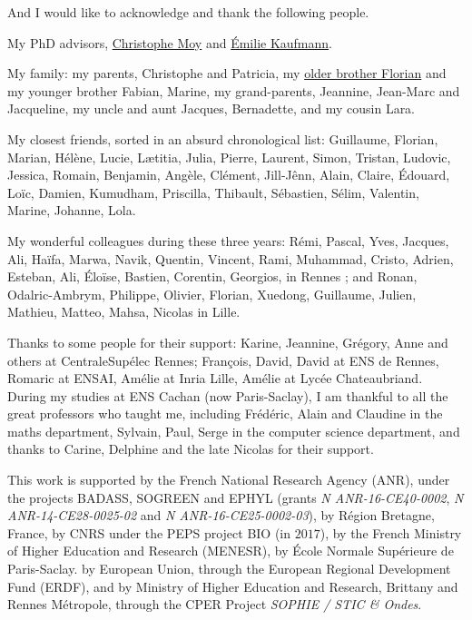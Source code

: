 
\begin{acknowledgements}


And I would like to acknowledge and thank the following people.

My PhD advisors, \href{https://moychristophe.wordpress.com/}{Christophe Moy} and \href{http://chercheurs.lille.inria.fr/ekaufman/research.html}{Émilie Kaufmann}.

My family: my parents, Christophe and Patricia, my \href{https://paris-sorbonne.academia.edu/FBesson}{older brother Florian} and my younger brother Fabian, Marine, my grand-parents, Jeannine, Jean-Marc and Jacqueline, my uncle and aunt Jacques, Bernadette, and my cousin Lara.

My closest friends, sorted in an absurd chronological list: Guillaume, Florian, Marian, Hélène, Lucie, Lætitia, Julia, Pierre, Laurent, Simon, Tristan, Ludovic, Jessica, Romain, Benjamin, Angèle, Clément, Jill-Jênn, Alain, Claire, Édouard, Loïc, Damien, Kumudham, Priscilla, Thibault, Sébastien, Sélim, Valentin, Marine, Johanne, Lola.

My wonderful colleagues during these three years: Rémi, Pascal, Yves, Jacques, Ali, Haïfa, Marwa, Navik, Quentin, Vincent, Rami, Muhammad, Cristo, Adrien, Esteban, Ali, Éloïse, Bastien, Corentin, Georgios, in Rennes ; and Ronan, Odalric-Ambrym, Philippe, Olivier, Florian, Xuedong, Guillaume, Julien, Mathieu, Matteo, Mahsa, Nicolas in Lille.

Thanks to some people for their support: Karine, Jeannine, Grégory, Anne and others at CentraleSupélec Rennes; François, David, David at ENS de Rennes, Romaric at ENSAI, Amélie at Inria Lille, Amélie at Lycée Chateaubriand.
During my studies at ENS Cachan (now Paris-Saclay), I am thankful to all the great professors who taught me, including Frédéric, Alain and Claudine in the maths department, Sylvain, Paul, Serge in the computer science department, and thanks to Carine, Delphine and the late Nicolas for their support.



This work is supported by
the French National Research Agency (ANR), under the projects BADASS, SOGREEN and EPHYL (grants \emph{N ANR-16-CE40-0002}, \emph{N ANR-14-CE28-0025-02} and \emph{N ANR-16-CE25-0002-03}),
by R\'egion Bretagne, France,
by CNRS under the PEPS project BIO (in $2017$),
by the French Ministry of Higher Education and Research (MENESR),
by \'Ecole Normale Sup\'erieure de Paris-Saclay.
by European Union, through the European Regional Development Fund (ERDF),
and by Ministry of Higher Education and Research, Brittany and Rennes Métropole, through the CPER Project \emph{SOPHIE / STIC \& Ondes}.



\end{acknowledgements}
